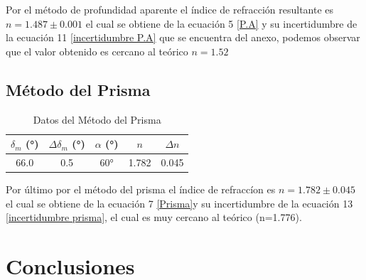 \documentclass[article,12pt]{elsarticle}
\begin{document}
Por el método de profundidad aparente el índice de refracción resultante es $n=1.487\pm0.001$ el cual se obtiene de la ecuación 5 \eqref{P.A} y su incertidumbre de la ecuación 11 \eqref{incertidumbre P.A} que se encuentra del anexo, podemos observar que el valor obtenido es cercano al teórico $n = 1.52$

\subsection*{Método del Prisma}
\begin{table}[H]
    \centering
    \begin{tabular}{|c|c|c|c|c|}
        \hline
        $\delta_m$ (°) & $\Delta\delta_m$ (°) & $\alpha$ (°) & $n$&$\Delta n$ \\
        \hline
        66.0 & 0.5 & 60° & 1.782&0.045 \\
        \hline
    \end{tabular}
    \caption{Datos del Método del Prisma}
    \label{tab:prisma}
\end{table}

Por último por el método del prisma el índice de refraccíon es $n=1.782\pm0.045$ el cual se obtiene de la ecuación 7 \eqref{Prisma}y su incertidumbre de la ecuación 13 \eqref{incertidumbre prisma}, el cual es muy cercano al teórico (n=1.776).



\section{Conclusiones}
\end{document}
